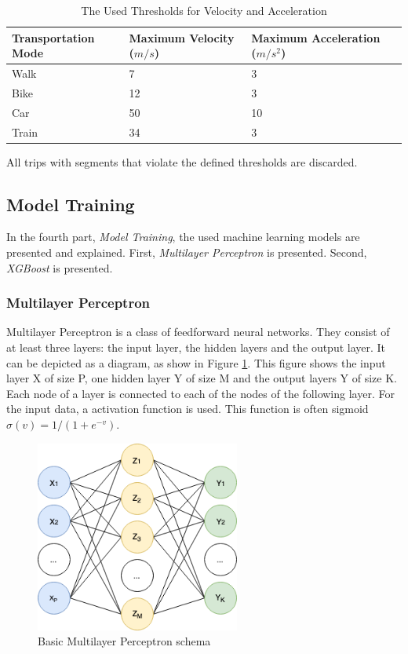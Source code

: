 \begin{table}[h!]
    \centering
    \begin{tabular}{|l l l l|} 
     \toprule
     Transportation Mode & Maximum Velocity ($m/s$) & Maximum Acceleration ($m/s^2$)\\
     \midrule
     Walk & 7 & 3 \\
     Bike & 12 & 3 \\
     Car & 50 & 10 \\
     Train & 34 & 3 \\
     \bottomrule
    \end{tabular}
    \caption{The Used Thresholds for Velocity and Acceleration \cite{Dabiri2018}}
    \label{table:thresholds}
\end{table}

All trips with segments that violate the defined thresholds are discarded.

\subsection{Model Training}
In the fourth part, \textit{Model Training}, the used machine learning models are presented and explained. First, \textit{Multilayer Perceptron} is presented. Second, \textit{XGBoost} is presented. 

\subsubsection{Multilayer Perceptron}
Multilayer Perceptron is a class of feedforward neural networks. They consist of at least three layers: the input layer, the hidden layers and the output layer. It can be depicted as a diagram, as show in Figure \ref{fig:mlp-struc}. This figure shows the input layer X of size P, one hidden layer Y of size M and the output layers Y of size K. Each node of a layer is connected to each of the nodes of the following layer. For the input data, a activation function is used. This function is often sigmoid $\sigma(v) = 1/(1+e^{-v})$. \cite{hastie2005elements}

\begin{figure}[h]
    \centering
    \includegraphics[width=0.6\textwidth]{images/nn_struct.png}
    \caption{Basic Multilayer Perceptron schema}
    \label{fig:mlp-struc}
\end{figure}

